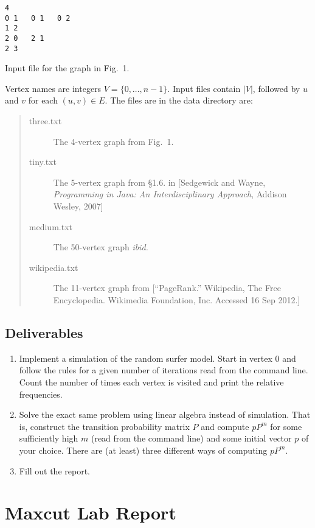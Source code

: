 \documentclass{tufte-handout}
\begin{document}
\begin{marginfigure}
\begin{verbatim}
4
0 1   0 1   0 2
1 2   
2 0   2 1
2 3
\end{verbatim}
\caption{Input file for the graph in Fig.~1.}
\end{marginfigure}

Vertex names are integers $V= \{0,\ldots, n-1\}$.
Input files contain $|V|$, followed by $u$ and $v$ for each $(u,v)\in
E$.
The files are in the data directory are:
\begin{quotation}
\begin{description}
\item[three.txt] The 4-vertex graph from Fig.~1.
\item[tiny.txt] The 5-vertex graph from \S{}1.6. in [Sedgewick and Wayne,
  \emph{Programming in Java: An Interdisciplinary Approach}, Addison
  Wesley, 2007]
\item[medium.txt] The 50-vertex graph \emph{ibid.}
\item[wikipedia.txt] The 11-vertex graph from
  [``PageRank.'' Wikipedia, The Free Encyclopedia. Wikimedia
  Foundation, Inc. Accessed 16 Sep 2012.]
\end{description}
\end{quotation}

\subsection{Deliverables}

\begin{enumerate}
\item Implement a simulation of the random surfer model. 
  Start in
  vertex 0 and follow the rules for a given number of iterations read
  from the command line. Count the number of times each vertex is
  visited and print the relative frequencies.
\item Solve the exact same problem using linear algebra instead of
  simulation.
  That is, construct the transition probability matrix $P$ and
  compute $pP^m$ for some sufficiently high $m$ (read from the command
  line) and some initial vector $p$ of your choice.
  There are (at least) three different ways of computing $p P^m$.
\item Fill out the report.
\end{enumerate}


\newpage
\section{Maxcut Lab Report}
\end{document}
